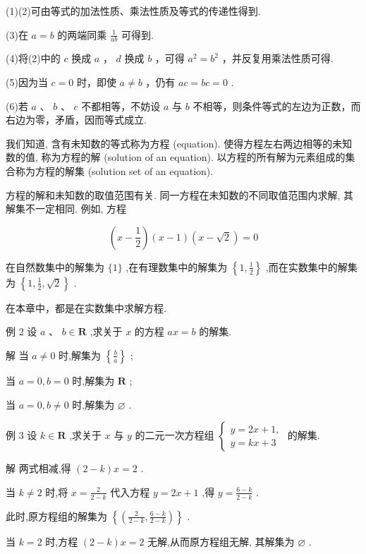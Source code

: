 \documentclass[10pt]{article}
\begin{document}
(1)(2)可由等式的加法性质、乘法性质及等式的传递性得到.

(3)在 \(a = b\) 的两端同乘 \(\frac{1}{ab}\) 可得到.

(4)将(2)中的 \(c\) 换成 \(a\) ， \(d\) 换成 \(b\) ，可得 \({a}^{2} = {b}^{2}\) ，并反复用乘法性质可得.

(5)因为当 \(c = 0\) 时，即使 \(a \neq  b\) ，仍有 \({ac} = {bc} = 0\) .

(6)若 \(a\text{ 、 }b\text{ 、 }c\) 不都相等，不妨设 \(a\) 与 \(b\) 不相等，则条件等式的左边为正数，而右边为零，矛盾，因而等式成立.

我们知道, 含有未知数的等式称为方程 (equation). 使得方程左右两边相等的未知数的值, 称为方程的解 (solution of an equation). 以方程的所有解为元素组成的集合称为方程的解集 (solution set of an equation).

方程的解和未知数的取值范围有关. 同一方程在未知数的不同取值范围内求解, 其解集不一定相同. 例如, 方程

\[
\left( {x - \frac{1}{2}}\right) \left( {x - 1}\right) \left( {x - \sqrt{2}}\right)  = 0
\]

在自然数集中的解集为 \(\{ 1\}\) ,在有理数集中的解集为 \(\left\{  {1,\frac{1}{2}}\right\}\) ,而在实数集中的解集为 \(\left\{  {1,\frac{1}{2},\sqrt{2}}\right\}\) .

在本章中，都是在实数集中求解方程.

例 2 设 \(a\text{ 、 }b \in  \mathbf{R}\) ,求关于 \(x\) 的方程 \({ax} = b\) 的解集.

解 当 \(a \neq  0\) 时,解集为 \(\left\{  \frac{b}{a}\right\}\) ;

当 \(a = 0,b = 0\) 时,解集为 \(\mathbf{R}\) ;

当 \(a = 0,b \neq  0\) 时,解集为 \(\varnothing\) .

例 3 设 \(k \in  \mathbf{R}\) ,求关于 \(x\) 与 \(y\) 的二元一次方程组 \(\left\{  \begin{array}{l} y = {2x} + 1, \\  y = {kx} + 3 \end{array}\right.\) 的解集.

解 两式相减,得 \(\left( {2 - k}\right) x = 2\) .

当 \(k \neq  2\) 时,将 \(x = \frac{2}{2 - k}\) 代入方程 \(y = {2x} + 1\) ,得 \(y = \frac{6 - k}{2 - k}\) .



此时,原方程组的解集为 \(\left\{  \left( {\frac{2}{2 - k},\frac{6 - k}{2 - k}}\right) \right\}\) .

当 \(k = 2\) 时,方程 \(\left( {2 - k}\right) x = 2\) 无解,从而原方程组无解, 其解集为 \(\varnothing\) .
\end{document}
